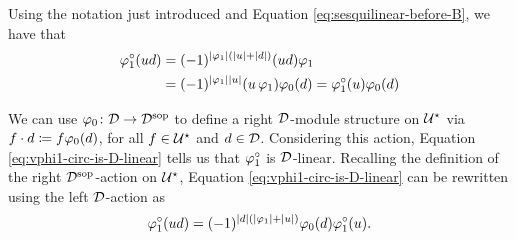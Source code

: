 \documentclass{amsbook}
\begin{document}



Using the notation just introduced and Equation \eqref{eq:sesquilinear-before-B}, we have that
%
\begin{equation}\label{eq:vphi1-circ-is-D-linear}
    \begin{split}
        \varphi_1^\circ (ud) &= (-1)^{|\varphi_1|(|u|+|d|)} (ud)\varphi_1 \\
        &=(-1)^{|\varphi_1||u|}(u\,\varphi_1 )\varphi_0(d) = 
        \varphi_1^\circ (u) \varphi_0 (d)
    \end{split}
\end{equation}
%

We can use $\varphi_0\colon \mathcal{D} \to \mathcal{D}^{\mathrm{sop}}$ to define a right $\mathcal{D}$-module structure on $\mathcal U^\star$ via $f\cdot d \coloneqq f\varphi_0(d)$, for all $f\in \mathcal U^\star$ and $d\in \mathcal{D}$. 
Considering this action, Equation \eqref{eq:vphi1-circ-is-D-linear} tells us that $\varphi_1^\circ$ is $\mathcal{D}$-linear. 
Recalling the definition of the right $\mathcal{D}^{\mathrm{sop}}$-action on $\mathcal U^\star$, Equation \eqref{eq:vphi1-circ-is-D-linear} can be rewritten using the left $\mathcal{D}$-action as
%
\begin{equation}\label{eq:sesquilinear-with-vphi1-circ}
    \varphi_1^\circ (ud) = (-1)^{|d|(|\varphi_1|+|u|)}\varphi_0 (d)\varphi_1^\circ (u).
\end{equation}


\end{document}
